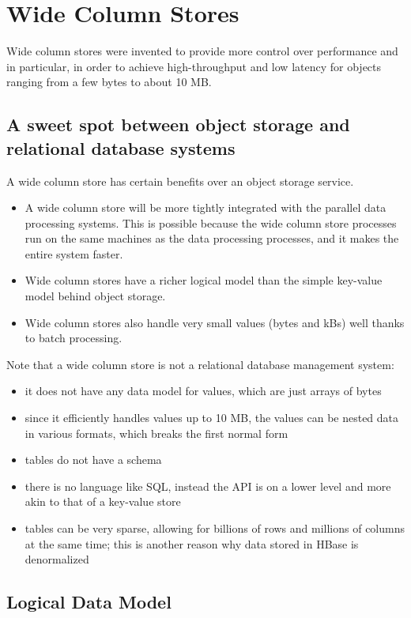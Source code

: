\section{Wide Column Stores}

Wide column stores were invented to provide more control over performance and in particular, in order to achieve high-throughput and low latency for objects ranging from a few bytes to about 10 MB.

\subsection{A sweet spot between object storage and relational database systems}

A wide column store has certain benefits over an object storage service.
\begin{itemize}
    \item A wide column store will be more tightly integrated with the parallel data processing systems. This is possible because the wide column store processes run on the same machines as the data processing processes, and it makes the entire system faster.
    \item Wide column stores have a richer logical model than the simple key-value model behind object storage.
    \item Wide column stores also handle very small values (bytes and kBs) well thanks to batch processing.
\end{itemize}
Note that a wide column store is not a relational database management system:
\begin{itemize}
    \item it does not have any data model for values, which are just arrays of bytes
    \item since it efficiently handles values up to 10 MB, the values can be nested data in various formats, which breaks the first normal form
    \item tables do not have a schema
    \item there is no language like SQL, instead the API is on a lower level and more akin to that of a key-value store
    \item tables can be very sparse, allowing for billions of rows and millions of columns at the same time; this is another reason why data stored in HBase is denormalized
\end{itemize}

\subsection{Logical Data Model}

